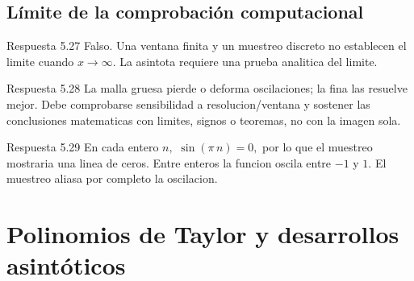 \documentclass[10pt,a4paper,oneside,openany]{book}
\begin{document}
\section{Límite de la comprobación computacional}
\begin{PSevenAnswerFixed}{Respuesta 5.27}
Falso. Una ventana finita y un muestreo discreto no establecen el limite cuando \(x\to \infty \). La asintota requiere una prueba analitica del limite.
\end{PSevenAnswerFixed}
\begin{PSevenAnswerFixed}{Respuesta 5.28}
La malla gruesa pierde o deforma oscilaciones; la fina las resuelve mejor. Debe comprobarse sensibilidad a resolucion/ventana y sostener las conclusiones matematicas con limites, signos o teoremas, no con la imagen sola.
\end{PSevenAnswerFixed}
\begin{PSevenAnswerFixed}{Respuesta 5.29}
En cada entero \(n,\) \(\sin(\pi \,n)=0,\) por lo que el muestreo mostraria una linea de ceros. Entre enteros la funcion oscila entre \(-1\) y \(1\). El muestreo aliasa por completo la oscilacion.
\end{PSevenAnswerFixed}
\chapter{Polinomios de Taylor y desarrollos asintóticos}
\end{document}
